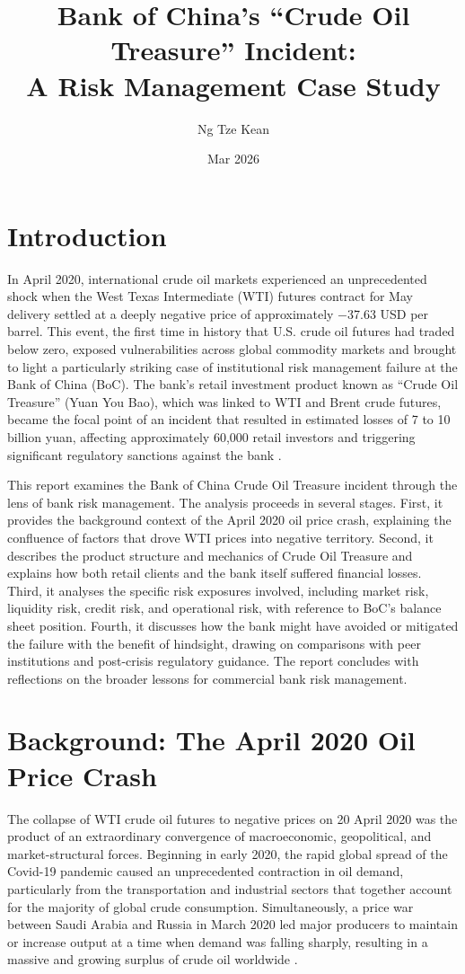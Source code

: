 \documentclass[a4paper,11pt]{article}
\title{\textbf{Bank of China's ``Crude Oil Treasure'' Incident: \\
A Risk Management Case Study}}
\author{Ng Tze Kean}
\date{Mar 2026}
\begin{document}
\maketitle

\section{Introduction}

In April 2020, international crude oil markets experienced an
unprecedented shock when the West Texas Intermediate (WTI) futures
contract for May delivery settled at a deeply negative price of
approximately $-$37.63 USD per barrel. This event, the first time in
history that U.S. crude oil futures had traded below zero, exposed
vulnerabilities across global commodity markets and brought to light
a particularly striking case of institutional risk management failure
at the Bank of China (BoC). The bank's retail investment product
known as ``Crude Oil Treasure'' (Yuan You Bao), which was linked to
WTI and Brent crude futures, became the focal point of an incident
that resulted in estimated losses of 7 to 10 billion yuan, affecting
approximately 60,000 retail investors and triggering significant
regulatory sanctions against the bank \cite{caixin2020stops}.

This report examines the Bank of China Crude Oil Treasure incident
through the lens of bank risk management. The analysis proceeds in
several stages. First, it provides the background context of the
April 2020 oil price crash, explaining the confluence of factors that
drove WTI prices into negative territory. Second, it describes the
product structure and mechanics of Crude Oil Treasure and explains
how both retail clients and the bank itself suffered financial
losses. Third, it analyses the specific risk exposures involved,
including market risk, liquidity risk, credit risk, and operational
risk, with reference to BoC's balance sheet position. Fourth, it
discusses how the bank might have avoided or mitigated the failure
with the benefit of hindsight, drawing on comparisons with peer
institutions and post-crisis regulatory guidance. The report
concludes with reflections on the broader lessons for commercial bank
risk management.

\section{Background: The April 2020 Oil Price Crash}

The collapse of WTI crude oil futures to negative prices on 20 April
2020 was the product of an extraordinary convergence of
macroeconomic, geopolitical, and market-structural forces. Beginning
in early 2020, the rapid global spread of the Covid-19 pandemic
caused an unprecedented contraction in oil demand, particularly from
the transportation and industrial sectors that together account for
the majority of global crude consumption. Simultaneously, a price war
between Saudi Arabia and Russia in March 2020 led major producers to
maintain or increase output at a time when demand was falling
sharply, resulting in a massive and growing surplus of crude oil
worldwide \cite{atlantis2022casestudy}.
\end{document}
